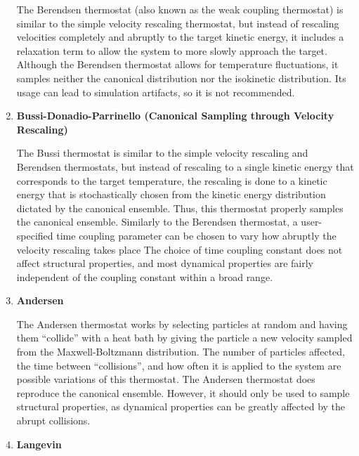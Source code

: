 \documentclass[9pt,bestpractices]{livecoms}
\begin{document}
\begin{enumerate}[listparindent=\parindent]
        The Berendsen\cite{berendsen1984molecular} thermostat (also known as the weak coupling thermostat) is similar to the simple velocity rescaling thermostat, but instead of rescaling velocities completely and abruptly to the target kinetic energy, it includes a relaxation term to allow the system to more slowly approach the target.
        Although the Berendsen thermostat allows for temperature fluctuations, it samples neither the canonical distribution nor the isokinetic distribution.
        Its usage can lead to simulation artifacts, so it is not recommended\cite{Harvey:1998:JCompChem,Braun:2018}.

    \item \textbf{Bussi-Donadio-Parrinello (Canonical Sampling through Velocity Rescaling)}

        The Bussi\cite{Bussi:2007:JChemPhys:Canonical} thermostat is similar to the simple velocity rescaling and Berendsen thermostats, but instead of rescaling to a single kinetic energy that corresponds to the target temperature, the rescaling is done to a kinetic energy that is stochastically chosen from the kinetic energy distribution dictated by the canonical ensemble.
        Thus, this thermostat properly samples the canonical ensemble.
        Similarly to the Berendsen thermostat, a user-specified time coupling parameter can be chosen to vary how abruptly the velocity rescaling takes place
        The choice of time coupling constant does not affect structural properties, and most dynamical properties are fairly independent of the coupling constant within a broad range\cite{Bussi:2007:JChemPhys:Canonical}.

    \item \textbf{Andersen}

        The Andersen\cite{andersen1980molecular} thermostat works by selecting particles at random and having them ``collide'' with a heat bath by giving the particle a new velocity sampled from the Maxwell-Boltzmann distribution.
        The number of particles affected, the time between ``collisions'', and how often it is applied to the system are possible variations of this thermostat.
        The Andersen thermostat does reproduce the canonical ensemble.
        However, it should only be used to sample structural properties, as dynamical properties can be greatly affected by the abrupt collisions.
    
    \item \textbf{Langevin}


\end{enumerate}
\end{document}
